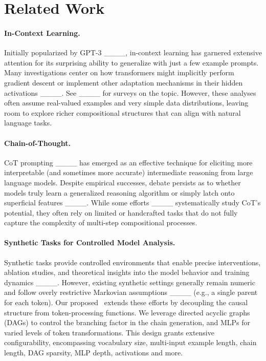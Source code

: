 \section{Related Work}
\paragraph{In-Context Learning.}
Initially popularized by GPT-3 ____, in-context learning has garnered extensive attention for its surprising ability to generalize with just a few example prompts. Many investigations center on how transformers might implicitly perform gradient descent or implement other adaptation mechanisms in their hidden activations ____. See ____ for surveys on the topic. However, these analyses often assume real-valued examples and very simple data distributions, leaving room to explore richer compositional structures that can align with natural language tasks.

\paragraph{Chain-of-Thought.}
CoT prompting ____ has emerged as an effective technique for eliciting more interpretable (and sometimes more accurate) intermediate reasoning from large language models. Despite empirical successes, debate persists as to whether models truly learn a generalized reasoning algorithm or simply latch onto superficial features ____. While some efforts ____ systematically study CoT's potential, they often rely on limited or handcrafted tasks that do not fully capture the complexity of multi-step compositional processes.

\paragraph{Synthetic Tasks for Controlled Model Analysis.}
Synthetic tasks provide controlled environments that enable precise interventions, ablation studies, and theoretical insights into the model behavior and training dynamics ____. However, existing synthetic settings generally remain numeric and follow overly restrictive Markovian assumptions ____ (e.g., a single parent for each token). Our proposed \coticl~extends these efforts by decoupling the causal structure from token-processing functions. We leverage directed acyclic graphs (DAGs) to control the branching factor in the chain generation, and MLPs for varied levels of token transformations. This design grants extensive configurability, encompassing vocabulary size, multi-input example length, chain length, DAG sparsity, MLP depth, activations and more.

